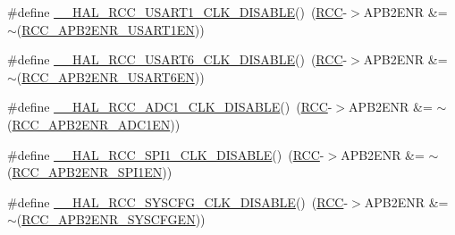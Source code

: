 \begin{DoxyCompactItemize}
\item 
\#define \hyperlink{group___r_c_c___a_p_b2___clock___enable___disable_gae0050944298552e9f02f56ec8634f5a6}{\+\_\+\+\_\+\+H\+A\+L\+\_\+\+R\+C\+C\+\_\+\+U\+S\+A\+R\+T1\+\_\+\+C\+L\+K\+\_\+\+D\+I\+S\+A\+B\+LE}()~(\hyperlink{group___peripheral__declaration_ga74944438a086975793d26ae48d5882d4}{R\+CC}-\/$>$A\+P\+B2\+E\+NR \&= $\sim$(\hyperlink{group___peripheral___registers___bits___definition_ga4666bb90842e8134b32e6a34a0f165f3}{R\+C\+C\+\_\+\+A\+P\+B2\+E\+N\+R\+\_\+\+U\+S\+A\+R\+T1\+EN}))
\item 
\#define \hyperlink{group___r_c_c___a_p_b2___clock___enable___disable_gac4b142412ef1e3dab8dcf5d5f7ca4d92}{\+\_\+\+\_\+\+H\+A\+L\+\_\+\+R\+C\+C\+\_\+\+U\+S\+A\+R\+T6\+\_\+\+C\+L\+K\+\_\+\+D\+I\+S\+A\+B\+LE}()~(\hyperlink{group___peripheral__declaration_ga74944438a086975793d26ae48d5882d4}{R\+CC}-\/$>$A\+P\+B2\+E\+NR \&= $\sim$(\hyperlink{group___peripheral___registers___bits___definition_ga0569d91f3b18ae130b7a09e0100c4459}{R\+C\+C\+\_\+\+A\+P\+B2\+E\+N\+R\+\_\+\+U\+S\+A\+R\+T6\+EN}))
\item 
\#define \hyperlink{group___r_c_c___a_p_b2___clock___enable___disable_ga80a9e4852bac07d3d9cc6390a361302a}{\+\_\+\+\_\+\+H\+A\+L\+\_\+\+R\+C\+C\+\_\+\+A\+D\+C1\+\_\+\+C\+L\+K\+\_\+\+D\+I\+S\+A\+B\+LE}()~(\hyperlink{group___peripheral__declaration_ga74944438a086975793d26ae48d5882d4}{R\+CC}-\/$>$A\+P\+B2\+E\+NR \&= $\sim$(\hyperlink{group___peripheral___registers___bits___definition_ga57b9f50cb96a2e4ceba37728b4a32a42}{R\+C\+C\+\_\+\+A\+P\+B2\+E\+N\+R\+\_\+\+A\+D\+C1\+EN}))
\item 
\#define \hyperlink{group___r_c_c___a_p_b2___clock___enable___disable_gaf2ccb5c6b63a60deb6463cbc629c10fe}{\+\_\+\+\_\+\+H\+A\+L\+\_\+\+R\+C\+C\+\_\+\+S\+P\+I1\+\_\+\+C\+L\+K\+\_\+\+D\+I\+S\+A\+B\+LE}()~(\hyperlink{group___peripheral__declaration_ga74944438a086975793d26ae48d5882d4}{R\+CC}-\/$>$A\+P\+B2\+E\+NR \&= $\sim$(\hyperlink{group___peripheral___registers___bits___definition_gae08a3510371b9234eb96369c91d3552f}{R\+C\+C\+\_\+\+A\+P\+B2\+E\+N\+R\+\_\+\+S\+P\+I1\+EN}))
\item 
\#define \hyperlink{group___r_c_c___a_p_b2___clock___enable___disable_gaf04a5f1f0d6d8577706022a866f4528e}{\+\_\+\+\_\+\+H\+A\+L\+\_\+\+R\+C\+C\+\_\+\+S\+Y\+S\+C\+F\+G\+\_\+\+C\+L\+K\+\_\+\+D\+I\+S\+A\+B\+LE}()~(\hyperlink{group___peripheral__declaration_ga74944438a086975793d26ae48d5882d4}{R\+CC}-\/$>$A\+P\+B2\+E\+NR \&= $\sim$(\hyperlink{group___peripheral___registers___bits___definition_ga7a9d56a8aa1fa0f519ecbdf0d19dd4da}{R\+C\+C\+\_\+\+A\+P\+B2\+E\+N\+R\+\_\+\+S\+Y\+S\+C\+F\+G\+EN}))

\end{DoxyCompactItemize}
